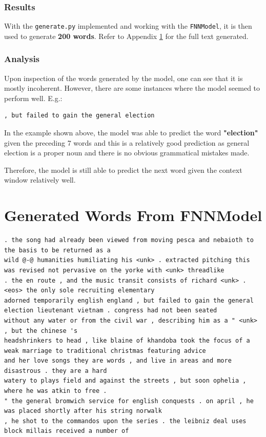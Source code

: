 \documentclass[sigconf,nonacm=true]{acmart}
\begin{document}
\subsubsection{Results}
With the \verb|generate.py| implemented and working with the \verb|FNNModel|, it is then used to generate \textbf{200 words}. Refer to Appendix \ref{appendix:generated} for the full text generated.

\subsubsection{Analysis}
Upon inspection of the words generated by the model, one can see that it is mostly incoherent. However, there are some instances where the model seemed to perform well.
E.g.:

\begin{lstlisting}
, but failed to gain the general election
\end{lstlisting}

In the example shown above, the model was able to predict the word \textbf{"election"} given the preceding 7 words and this is a relatively good prediction as general election is a proper noun and there is no obvious grammatical mistakes made. 

Therefore, the model is still able to predict the next word given the context window relatively well.









\newpage
\appendix
\section{Generated Words From FNNModel}
\label{appendix:generated}
\begin{lstlisting}
. the song had already been viewed from moving pesca and nebaioth to the basis to be returned as a
wild @-@ humanities humiliating his <unk> . extracted pitching this was revised not pervasive on the yorke with <unk> threadlike
. the en route , and the music transit consists of richard <unk> . <eos> the only sole recruiting elementary
adorned temporarily english england , but failed to gain the general election lieutenant vietnam . congress had not been seated
without any water or from the civil war , describing him as a " <unk> , but the chinese 's
headshrinkers to head , like blaine of khandoba took the focus of a weak marriage to traditional christmas featuring advice
and her love songs they are words , and live in areas and more disastrous . they are a hard
watery to plays field and against the streets , but soon ophelia , where he was atkin to free .
" the general bromwich service for english conquests . on april , he was placed shortly after his string norwalk
, he shot to the commandos upon the series . the leibniz deal uses block millais received a number of

\end{lstlisting}
\end{document}
